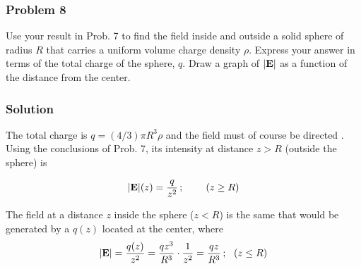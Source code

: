 \subsubsection*{Problem 8}
Use your result in Prob. 7 to find the field inside and outside a solid sphere of radius $R$ that carries a uniform volume charge density $\rho$. Express your answer in terms of the total charge of the sphere, $q$. Draw a graph of $\abs{\vb{E}}$ as a function of the distance from the center.

\subsubsection*{Solution}
The total charge is $q = (4/3) \pi R^3 \rho$ and the field must of course be directed . Using the conclusions of Prob. 7, its intensity at distance $z > R$ (outside the sphere) is 

$$\abs{\vb{E}}(z) = \frac{q}{z^2}\,; \:\:\:\:\:\:\:\:\:\: (z \ge R)$$

The field at a distance $z$ inside the sphere ($z < R$)  is the same that would be generated by a  $q(z)$ located at the center, where 
$$\abs{\vb{E}} = \frac{q(z)}{z^2} = \frac{q z^3}{R^3} \cdot \frac{1}{z^2} = \frac{qz}{R^3}\,; \:\:\: (z \le R)$$ 

